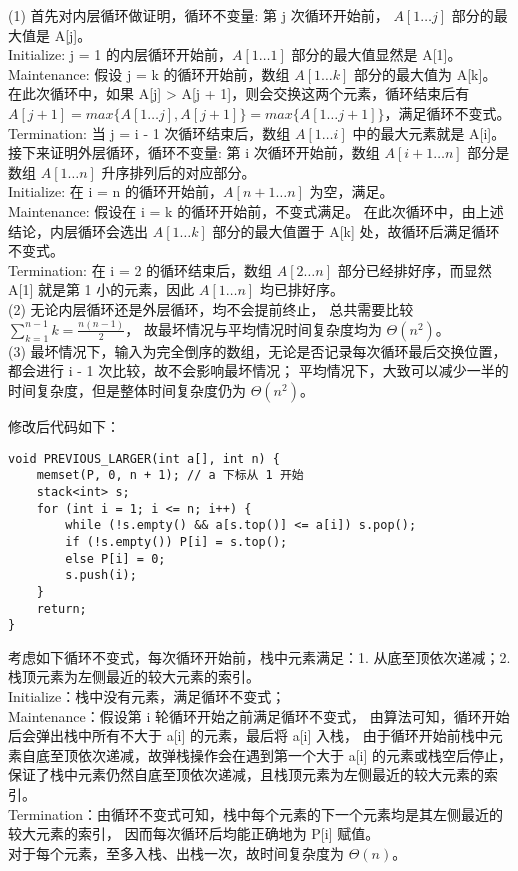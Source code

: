 \documentclass[12pt, a4paper, oneside]{ctexart}
\begin{document}
\newpage
\begin{solution}[3.2]
(1) 首先对内层循环做证明，循环不变量: 第 j 次循环开始前， $A[1 \dots j]$ 部分的最大值是 A[j]。
\\Initialize: j = 1 的内层循环开始前，$A[1 \dots 1]$ 部分的最大值显然是 A[1]。
\\Maintenance: 假设 j = k 的循环开始前，数组 $A[1 \dots k]$ 部分的最大值为 A[k]。
在此次循环中，如果 A[j] > A[j + 1]，则会交换这两个元素，循环结束后有 $A[j + 1] = max\{A[1 \dots j], A[j + 1]\} = max\{A[1 \dots j + 1]\}$，满足循环不变式。
\\Termination: 当 j = i - 1 次循环结束后，数组 $A[1 \dots i]$ 中的最大元素就是 A[i]。
\\接下来证明外层循环，循环不变量: 第 i 次循环开始前，数组 $A[i + 1 \dots n]$ 部分是数组 $A[1 \dots n]$ 升序排列后的对应部分。
\\Initialize: 在 i = n 的循环开始前，$A[n + 1 \dots n]$ 为空，满足。
\\Maintenance: 假设在 i = k 的循环开始前，不变式满足。
在此次循环中，由上述结论，内层循环会选出 $A[1 \dots k]$ 部分的最大值置于 A[k] 处，故循环后满足循环不变式。
\\Termination: 在 i = 2 的循环结束后，数组 $A[2 \dots n]$ 部分已经排好序，而显然 A[1] 就是第 1 小的元素，因此 $A[1 \dots n]$ 均已排好序。
\\(2) 无论内层循环还是外层循环，均不会提前终止，
总共需要比较 $\sum_{k = 1}^{n - 1} k = \frac{n(n - 1)}{2}$，
故最坏情况与平均情况时间复杂度均为 $\Theta(n^2)$。
\\(3) 最坏情况下，输入为完全倒序的数组，无论是否记录每次循环最后交换位置，都会进行 i - 1 次比较，故不会影响最坏情况；
平均情况下，大致可以减少一半的时间复杂度，但是整体时间复杂度仍为 $\Theta(n^2)$。
\end{solution}

\newpage
\begin{solution}[3.5]
修改后代码如下：
\begin{verbatim}
void PREVIOUS_LARGER(int a[], int n) {
    memset(P, 0, n + 1); // a 下标从 1 开始
    stack<int> s;
    for (int i = 1; i <= n; i++) {
        while (!s.empty() && a[s.top()] <= a[i]) s.pop();
        if (!s.empty()) P[i] = s.top();
        else P[i] = 0;
        s.push(i);
    }
    return;
}
\end{verbatim}
考虑如下循环不变式，每次循环开始前，栈中元素满足：1. 从底至顶依次递减；2. 栈顶元素为左侧最近的较大元素的索引。
\\Initialize：栈中没有元素，满足循环不变式；
\\Maintenance：假设第 i 轮循环开始之前满足循环不变式，
由算法可知，循环开始后会弹出栈中所有不大于 a[i] 的元素，最后将 a[i] 入栈，
由于循环开始前栈中元素自底至顶依次递减，故弹栈操作会在遇到第一个大于 a[i] 的元素或栈空后停止，
保证了栈中元素仍然自底至顶依次递减，且栈顶元素为左侧最近的较大元素的索引。
\\Termination：由循环不变式可知，栈中每个元素的下一个元素均是其左侧最近的较大元素的索引，
因而每次循环后均能正确地为 P[i] 赋值。
\\对于每个元素，至多入栈、出栈一次，故时间复杂度为 $\Theta(n)$。
\end{solution}
\end{document}
